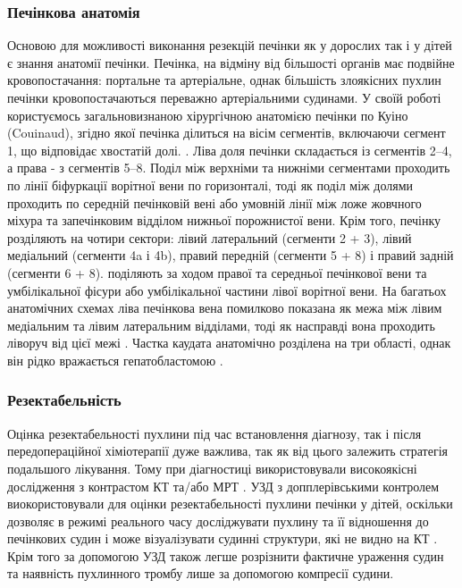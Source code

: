 \subsubsection{Печінкова анатомія}
Основою для можливості виконання резекцій печінки як у дорослих так і у дітей є знання анатомії печінки. Печінка, на відміну від більшості органів має подвійне кровопостачання: портальне та артеріальне, однак більшість злоякісних пухлин печінки кровопостачаються переважно артеріальними судинами. У своїй роботі користуємось загальновизнаною хірургічною анатомією печінки по Куіно (Couinaud), згідно якої печінка ділиться на вісім сегментів, включаючи сегмент 1, що відповідає хвостатій долі. \cite{pmid28347528}. Ліва доля печінки складається із сегментів 2–4, а права - з сегментів 5–8. Поділ між верхніми та нижніми сегментами проходить по лінії біфуркації ворітної вени по горизонталі, тоді як поділ між долями проходить по середній печінковій вені або умовній лінії між ложе жовчного міхура та запечінковим відділом нижньої порожнистої вени. Крім того, печінку розділяють на чотири сектори: лівий латеральний (сегменти 2 + 3), лівий медіальний (сегменти 4a і 4b), правий передній (сегменти 5 + 8) і правий задній (сегменти 6 + 8).  поділяють за ходом правої та середньої печінкової вени та умбілікальної фісури або умбілікальної частини лівої ворітної вени. На багатьох анатомічних схемах ліва печінкова вена помилково показана як межа між лівим медіальним та лівим латеральним відділами, тоді як насправді вона проходить ліворуч від цієї межі \cite{pmid2852560}. Частка каудата анатомічно розділена на три області, однак він рідко вражається гепатобластомою \cite{pmid28620649}. 

\subsubsection{Резектабельність}
Оцінка резектабельності пухлини під час встановлення діагнозу, так і після передопераційної хіміотерапії дуже важлива, так як від цього залежить стратегія подальшого лікування. Тому при діагностиці використовували високоякісні дослідження з контрастом КТ та/або МРТ \cite{pmid28651228}. УЗД з допплерівськими контролем виокористовували для оцінки резектабельності пухлини печінки у дітей, оскільки дозволяє в режимі реального часу досліджувати пухлину та її відношення до печінкових судин і може візуалізувати судинні структури, які не видно на КТ \cite{pmid28921839}. Крім того за допомогою УЗД також легше розрізнити фактичне ураження судин та наявність пухлинного тромбу лише за допомогою компресії судини. 

